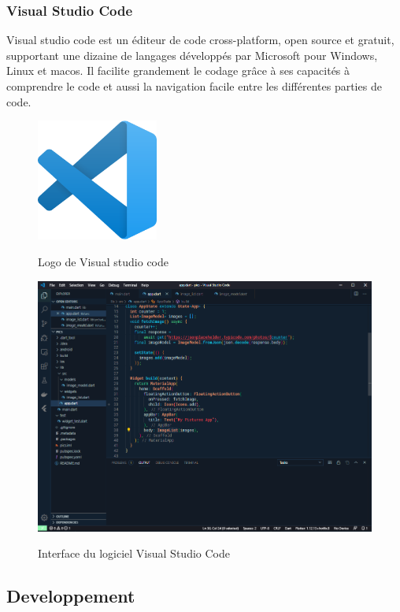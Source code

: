 \subsubsection{Visual Studio Code}
Visual studio code est un éditeur de code cross-platform, open source et gratuit, supportant une dizaine de langages développés par Microsoft pour Windows, Linux et macos. Il facilite grandement le codage grâce à ses capacités à comprendre le code et aussi la navigation facile entre les différentes parties de code.
\begin{figure}[!h]
    \centering
    \includegraphics[width=4cm]{images/Chapitre3/vscode.png}
    \label{fig:label7}
    \caption{Logo de Visual studio code}
\end{figure}
\begin{figure}[!h]

    \centering
    \includegraphics[width=6in]{images/Chapitre3/interface_vs_code.png}
    \label{fig:interfacevscode}
    \caption{Interface du logiciel Visual Studio Code}
\end{figure}
\newpage
\subsection{Developpement}
